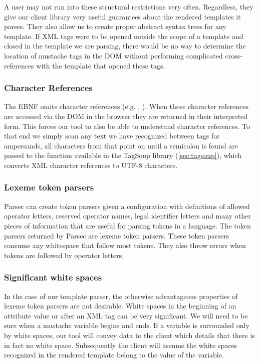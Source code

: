 \documentclass[thesis.tex]{subfiles}
\begin{document}
A user may not run into these structural restrictions very often. Regardless,
they give our client library very useful guarantees about the rendered templates
it parses. They also allow us to create proper abstract syntax trees for any
template.
If XML tags were to be opened outside the scope of a template
and closed in the template we are parsing, there would be no way to determine
the location of mustache tags in the DOM without performing complicated
cross-references with the template that opened these tags.

\subsubsection{Character References}
The EBNF omits character references (e.g. , ).
When those character references are accessed via the DOM in the browser they are
returned in their interpreted form. This forces our tool to also be able to
understand character references. To that end we simply scan any text we have
recognized between tags for ampersands, all characters from that point on until
a semicolon is found are passed to the  function available
in the TagSoup library (\ref{sec:tagsoup}), which converts
XML character references to UTF-8 characters.

\subsubsection{Lexeme token parsers}
Parsec can create token parsers given a configuration with definitions of
allowed operator letters, reserved operator names,
legal identifier letters and many other pieces of information
that are useful for parsing tokens in a language.
The token parsers returned by Parsec are lexeme token parsers.
These token parsers consume any whitespace that follow most tokens.
They also throw errors when tokens are followed by operator letters.

\subsubsection{Significant white spaces}
In the case of our template parser, the otherwise advantageous properties
of lexeme token parsers are not desirable.
White spaces in the beginning of an attribute value or after an XML tag can be
very significant.
We will need to be sure when a mustache variable begins and ends.
If a variable is surrounded only by white spaces, our tool will convey
data to the client which details that there is in fact no white space.
Subsequently the client will assume the white spaces recognized in the
rendered template belong to the value of the variable.
\end{document}
